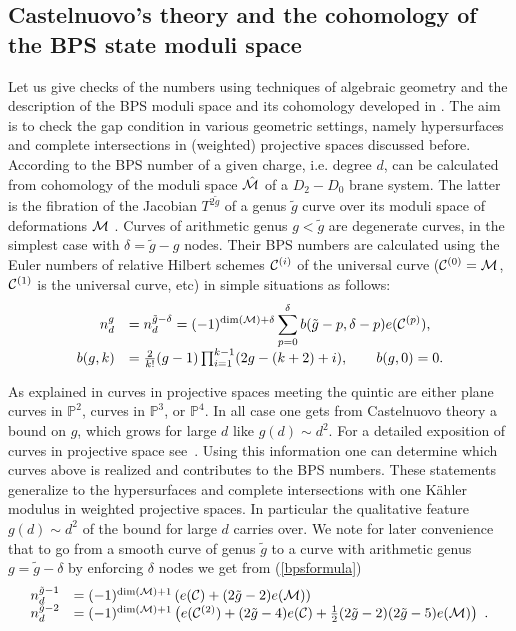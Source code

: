 \documentclass[12pt]{article}
\begin{document}
\subsection{Castelnuovo's theory and the cohomology of the BPS state moduli space}

Let us give checks of the numbers using techniques of algebraic
geometry and the description of the BPS moduli space and its
cohomology developed in \cite{GVII,Katz:1999}. The aim is to check
the gap condition in various geometric settings, namely
hypersurfaces and complete intersections in (weighted) projective
spaces discussed before. According to \cite{GVII,Katz:1999} the
BPS number of a given charge, i.e. degree $d$, can be calculated
from cohomology of the moduli  space $\hat {\cal M}$ of a
$D_2-D_0$ brane system. The latter is the fibration of the
Jacobian $T^{2 \tilde g}$ of a genus ${\tilde g}$ curve over its
moduli space of deformations ${\cal M}$ . Curves of arithmetic
genus $g<{\tilde g}$ are degenerate curves, in the simplest case
with $\delta={\tilde g}-g$ nodes. Their BPS numbers are calculated
using the Euler numbers of relative Hilbert schemes ${\cal
C}^{(i)}$ of the universal curve (${\cal C}^{(0)}={\cal M}$,
${\cal C}^{(1)}$ is the universal curve, etc) in simple situations
as follows:
\begin{equation}
\begin{array}{rl}
n_d^{g}&={\displaystyle n_d^{{\tilde g} -\delta}=(-1)^{{\rm
dim}({\cal M})+\delta}\sum_{p=0}^\delta b( {\tilde g}-p,\delta-p)
e({\cal C}^{(p)})},
\\[ 3 mm]
b(g,k)&={2\over k!} (g-1)\prod_{i=1}^{k-1} (2 g - (k+2) +i),\qquad   b(g,0)=0.
\end{array}
\label{bpsformula}
\end{equation}

As explained in \cite{Katz:1999} curves in  projective spaces
meeting the  quintic are either plane curves in $\mathbb{P}^2$,
curves in $\mathbb{P}^3$, or $\mathbb{P}^4$. In all case one gets
from Castelnuovo theory a bound on $g$, which grows for large $d$
like  $g(d)\sim d^2$. For a detailed exposition of curves in
projective space see~\cite{Harris}. Using this information one can
determine which curves above is realized and contributes to the
BPS numbers. These statements generalize to the  hypersurfaces and
complete intersections with one K\"ahler modulus in weighted
projective spaces. In particular the qualitative feature $g(d)\sim
d^2$ of the bound for large $d$ carries over. We note for
later convenience that to go from a smooth curve of genus $\tilde
g$ to a curve with arithmetic genus $g=\tilde g-\delta$ by
enforcing $\delta$ nodes we get from (\ref{bpsformula})
\begin{equation}
\begin{array}{rl}
n^{\tilde g-1}_d&=(-1)^{{\rm dim}({\cal M})+1}\left( e({\cal C})+ (2\tilde g-2) e(\cal M)\right)\\
n^{\tilde g-2}_d&=(-1)^{{\rm dim}({\cal M})+1}\left(e({\cal C}^{(2)})+(2 \tilde g-4) e({\cal C})+{1\over 2}(2 \tilde g-2) (2 \tilde g-5)e(\cal M)\right)\ . \\
\end{array}
\label{BPSspecial}
\end{equation}
\end{document}
